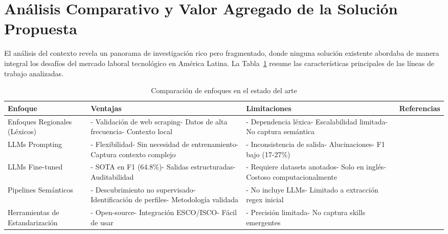 \section{Análisis Comparativo y Valor Agregado de la Solución Propuesta}

El análisis del contexto revela un panorama de investigación rico pero fragmentado, donde ninguna solución existente abordaba de manera integral los desafíos del mercado laboral tecnológico en América Latina. La Tabla~\ref{tab:estado-arte-comparativo} resume las características principales de las líneas de trabajo analizadas.

\begin{table}[H]
\centering
\caption{Comparación de enfoques en el estado del arte}
\label{tab:estado-arte-comparativo}
\begin{tabular}{|p{3cm}|p{4cm}|p{4cm}|p{3cm}|}
\hline
\textbf{Enfoque} & \textbf{Ventajas} & \textbf{Limitaciones} & \textbf{Referencias} \\
\hline
Enfoques Regionales (Léxicos) & - Validación de web scraping\newline - Datos de alta frecuencia\newline - Contexto local & - Dependencia léxica\newline - Escalabilidad limitada\newline - No captura semántica & \parencite{rubio2025, aguilera2018, martinez2024} \\
\hline
LLMs Prompting & - Flexibilidad\newline - Sin necesidad de entrenamiento\newline - Captura contexto complejo & - Inconsistencia de salida\newline - Alucinaciones\newline - F1 bajo (17-27\%) & \parencite{nguyen2024} \\
\hline
LLMs Fine-tuned & - SOTA en F1 (64.8\%)\newline - Salidas estructuradas\newline - Auditabilidad & - Requiere datasets anotados\newline - Solo en inglés\newline - Costoso computacionalmente & \parencite{herandi2024, zhang2022} \\
\hline
Pipelines Semánticos & - Descubrimiento no supervisado\newline - Identificación de perfiles\newline - Metodología validada & - No incluye LLMs\newline - Limitado a extracción regex inicial & \parencite{lukauskas2023} \\
\hline
Herramientas de Estandarización & - Open-source\newline - Integración ESCO/ISCO\newline - Fácil de usar & - Precisión limitada\newline - No captura skills emergentes & \parencite{kavargyris2025} \\
\hline
\end{tabular}
\end{table}


